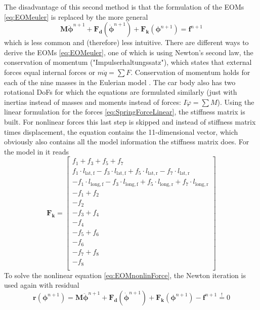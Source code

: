 The disadvantage of this second method is that the formulation of the EOMs \eqref{eq:EOMeuler} is replaced by the more general
\begin{equation}\label{eq:EOMnonlinForce}
	     \boldsymbol{M} \ddot{\boldsymbol{\phi}}^{n+1}+ \boldsymbol{F_d} (\dot{\boldsymbol{\phi}}^{n+1})  + \boldsymbol{F_k}(\boldsymbol{\phi}^{n+1})=\boldsymbol{f}^{n+1}
\end{equation} 
which is less common and (therefore) less intuitive.
There are different ways to derive the EOMs \eqref{eq:EOMeuler}, one of which is using Newton's second law, the conservation of momentum ("Impulserhaltungssatz"), which states that external forces equal internal forces or $m\ddot{q} = \sum F$. 
Conservation of momentum holds for each of the nine masses in the Eulerian model . 
The car body also has two rotational DoFs for which the equations are formulated similarly (just with inertias instead of masses and moments instead of forces: $I\ddot{\varphi} = \sum M$). 
Using the linear formulation for the forces \eqref{eq:SpringForceLinear}, the stiffness matrix is built.
For nonlinear forces this last step is skipped and instead of stiffness matrix times displacement, the equation contains the 11-dimensional vector, which obviously also contains all the model information the stiffness matrix does. 
For the model in  it reads
\begin{equation}\label{eq:ForceModel}
	\boldsymbol{F_k} = 
	\begin{bmatrix}
		f_1 + f_3 + f_5 + f_7 \\
		f_1 \cdot l_\mathrm{lat,f} - f_3 \cdot l_\mathrm{lat,f} + f_5 \cdot l_\mathrm{lat,r} -  f_7 \cdot l_\mathrm{lat,r} \\
		-f_1 \cdot l_\mathrm{long,f} - f_3 \cdot l_\mathrm{long,f} + f_5 \cdot l_\mathrm{long,r} + f_7 \cdot l_\mathrm{long,r} \\
		-f_1 + f_2 \\
		-f_2 \\
		-f_3 + f_4 \\
		-f_4 \\
		-f_5 + f_6 \\
		-f_6 \\
		-f_7 + f_8 \\
		-f_8 \\
	\end{bmatrix}
\end{equation}
To solve the nonlinear equation \eqref{eq:EOMnonlinForce}, the Newton iteration is used again with residual
\begin{equation}
   \boldsymbol{r}(\boldsymbol{\phi}^{n+1}) = \boldsymbol{M} \ddot{\boldsymbol{\phi}}^{n+1}+ \boldsymbol{F_d} (\dot{\boldsymbol{\phi}}^{n+1})  + \boldsymbol{F_k}(\boldsymbol{\phi}^{n+1}) - \boldsymbol{f}^{n+1} \overset{!}{=}0
\end{equation}
